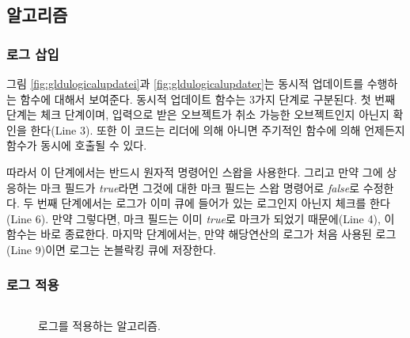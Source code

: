 \subsection{알고리즘}

\subsubsection{로그 삽입}
그림 \ref{fig:gldulogicalupdatei}과 \ref{fig:gldulogicalupdater}는 동시적 업데이트를 수행하는
함수에 대해서 보여준다.
동시적 업데이트 함수는 3가지 단계로 구분된다.
첫 번째 단계는 체크 단계이며, 입력으로 받은 오브젝트가 취소 가능한 오브젝트인지 아닌지 확인을 한다(Line 3). 
또한 이 코드는 리더에 의해 아니면 주기적인 함수에 의해 언제든지  함수가 동시에 호출될 수 있다. 

따라서 이 단계에서는 반드시 원자적 명령어인 스왑을 사용한다.
그리고 만약 그에 상응하는 마크 필드가 \textit{true}라면 그것에 대한 마크 필드는 스왑 명령어로 \textit{false}로
수정한다.
두 번째 단계에서는 로그가 이미 큐에 들어가 있는 로그인지 아닌지 체크를 한다(Line 6).
만약 그렇다면, 마크 필드는 이미 \textit{true}로 마크가 되었기 때문에(Line 4), 이 함수는 바로 종료한다.
마지막 단계에서는, 만약 해당연산의 로그가 처음 사용된 로그(Line 9)이면 로그는 논블락킹 큐에 저장한다.

\subsubsection{로그 적용}

\begin{figure}[h]
\begin{center}
\inputminted[linenos,fontsize=\footnotesize, tabsize=4]{c}{src/ldu_physical.c}
\end{center}
\caption{로그를 적용하는 알고리즘.}
\label{fig:glduphysicalupdate}
\end{figure}


